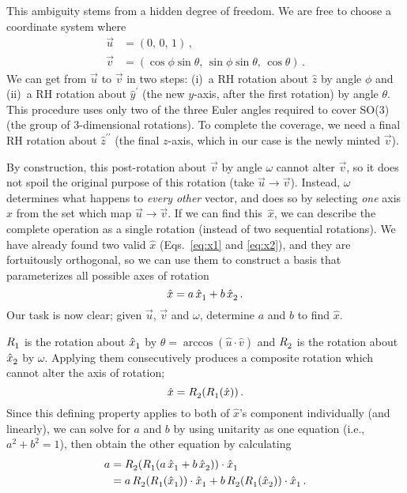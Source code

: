 \documentclass[12pt, nofootinbib, notitlepage]{revtex4}
\newcommand{\vecN}[1]{\hat{#1}}
\newcommand{\vvv}[3]{(#1,\,#2,\,#3)}
\newcommand{\ax}{\vecN{x}}
\begin{document}
This ambiguity stems from a hidden degree of freedom.
We are free to choose a coordinate system where
\begin{align}
	\vec{u} & = \vvv{0}{0}{1}
	\,,\\
	\vec{v} & = \vvv{\cos \phi \sin \theta}{\sin \phi \sin \theta}{\cos\theta}
	\,.
\end{align}
We can get from $\vec{u}$ to $\vec{v}$ in two steps:
(i)~a RH rotation about $\vecN{z}$ by angle $\phi$ and
(ii)~a RH rotation about $\vecN{y}^\prime$ (the new $y$-axis, after the first rotation) by angle $\theta$.
This procedure uses only two of the three Euler angles required to 
cover SO(3) (the group of 3-dimensional rotations).
To complete the coverage, we need a final RH rotation about $\vecN{z}^{\prime\prime}$ 
(the final $z$-axis, which in our case is the newly minted $\vec{v}$).

By construction, this post-rotation about $\vec{v}$ by angle $\omega$ 
cannot alter $\vec{v}$, so it does not spoil
the original purpose of this rotation (take $\vec{u}\to\vec{v}$).
Instead, $\omega$ determines what happens to \emph{every other} vector, 
and does so by selecting \emph{one} axis $\ax$ from the set which map $\vec{u}\to\vec{v}$.
If we can find this~$\ax$, we can describe the complete operation as a single rotation 
(instead of two sequential rotations).
We have already found two valid $\ax$ (Eqs.~\ref{eq:x1} and \ref{eq:x2}), 
and they are fortuitously orthogonal, so we can use them to construct
a basis that parameterizes all possible axes of rotation
\begin{equation}
	\ax = a\,\ax_1\ds + b\,\ax_2\ds
	\,.
\end{equation}
Our task is now clear; given $\vec{u}$, $\vec{v}$ and $\omega$, 
determine $a$ and $b$ to find $\ax$.

$R_1^{}$ is the rotation about $\ax_1\ds$
by $\theta=\arccos(\vecN{u}\cdot\vecN{v})$ and $R_2^{}$ is the rotation about $\ax_2\ds$ by $\omega$.
Applying them consecutively produces a composite rotation
which cannot alter the axis of rotation;
\begin{equation}
	\ax = R_2\ds(R_1\ds(\ax))\,.
\end{equation}
Since this defining property applies to both of $\ax$'s component individually (and linearly), 
we can solve for $a$ and $b$ by using unitarity as one equation (i.e., ${a^2+b^2=1}$), 
then obtain the other equation by calculating
\begin{align}\label{eq:a}
	a & = R_2\ds(R_1\ds(a\,\ax_1\ds + b\,\ax_2\ds))\cdot\ax_1\ds\nonumber\\
		& = a\,R_2\ds(R_1\ds(\ax_1\ds))\cdot\ax_1\ds + b\,R_2\ds(R_1\ds(\ax_2\ds))\cdot\ax_1\ds\,.
\end{align}
\end{document}
